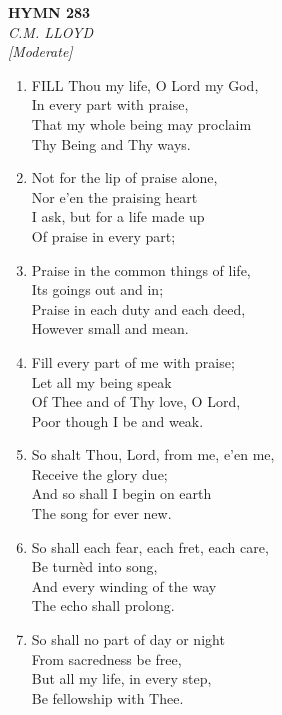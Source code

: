 \documentclass[11pt,a4paper]{article}
\begin{document}
\newpage
\begin{center}
    {\Large \textbf{HYMN 283}}
    \\
    \textit{C.M. LLOYD}
    \\
    \textit{\small [Moderate]}
\end{center}
\vspace{1em}

\begin{enumerate}
    \item FILL Thou my life, O Lord my God, \\
        In every part with praise, \\
        That my whole being may proclaim \\
        Thy Being and Thy ways.

    \item Not for the lip of praise alone, \\
        Nor e'en the praising heart \\
        I ask, but for a life made up \\
        Of praise in every part;

    \item Praise in the common things of life, \\
        Its goings out and in; \\
        Praise in each duty and each deed, \\
        However small and mean.

    \item Fill every part of me with praise; \\
        Let all my being speak \\
        Of Thee and of Thy love, O Lord, \\
        Poor though I be and weak.

    \item So shalt Thou, Lord, from me, e'en me, \\
        Receive the glory due; \\
        And so shall I begin on earth \\
        The song for ever new.

    \item So shall each fear, each fret, each care, \\
        Be turn\`ed into song, \\
        And every winding of the way \\
        The echo shall prolong.

    \item So shall no part of day or night \\
        From sacredness be free, \\
        But all my life, in every step, \\
        Be fellowship with Thee.

\end{enumerate}
\end{document}
